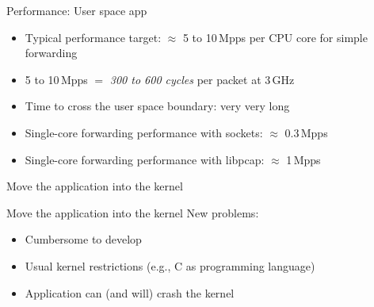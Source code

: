 \documentclass[NET,english,aspectratio=169,notitleframe]{tumbeamer}
\begin{document}
\begin{frame}{Performance: User space app}
\begin{itemize}
\item<1-> Typical performance target: $\approx$ 5 to 10\,Mpps per CPU core for simple forwarding
\item<1-> 5 to 10\,Mpps $=$ \emph{300 to 600 cycles} per packet at 3\,GHz
\vspace{1em}
\item<2-> Time to cross the user space boundary: very very long
\vspace{1em}
\item<3-> Single-core forwarding performance with sockets: $\approx$ 0.3\,Mpps
\item<3-> Single-core forwarding performance with libpcap: $\approx$ 1\,Mpps
\end{itemize}
\end{frame}


\begin{frame}{Move the application into the kernel}
\centering
\end{frame}

\begin{frame}{Move the application into the kernel}
New problems:
\begin{itemize}
\item Cumbersome to develop
\item Usual kernel restrictions (e.g., C as programming language)
\item Application can (and will) crash the kernel
\end{itemize}
\end{frame}
\end{document}
